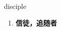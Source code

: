 
\begin{frame}
{\huge disciple}
\begin{center}
\begin{enumerate}\Large
  \item \textbf{信徒，追随者}
\end{enumerate}
\end{center}
\end{frame}
